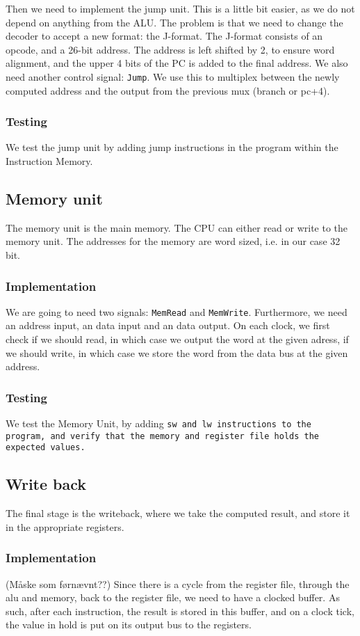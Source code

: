 Then we need to implement the jump unit. This is a little bit easier, as we do
not depend on anything from the ALU. The problem is that we need to change the
decoder to accept a new format: the J-format. The J-format consists of an
opcode, and a 26-bit address. The address is left shifted by 2, to ensure word
alignment, and the upper 4 bits of the PC is added to the final address. We
also need another control signal: \texttt{Jump}. We use this to multiplex
between the newly computed address and the output from the previous mux (branch
or pc+4).

\subsubsection*{Testing}
We test the jump unit by adding jump instructions in the program within the
Instruction Memory.

\subsection{Memory unit}
The memory unit is the main memory. The CPU can either read or write to the
memory unit. The addresses for the memory are word sized, i.e. in our case 32
bit.

\subsubsection*{Implementation}
We are going to need two signals: \texttt{MemRead} and \texttt{MemWrite}.
Furthermore, we need an address input, an data input and an data output. On
each clock, we first check if we should read, in which case we output the word
at the given adress, if we should write, in which case we store the word from
the data bus at the given address.

\subsubsection*{Testing}
We test the Memory Unit, by adding \tt{sw} and \tt{lw} instructions to the
program, and verify that the memory and register file holds the expected
values.

\subsection{Write back}
The final stage is the writeback, where we take the computed result, and store
it in the appropriate registers.

\subsubsection*{Implementation}
(Måske som førnævnt??) Since there is a cycle from the register file, through
the alu and memory, back to the register file, we need to have a clocked
buffer. As such, after each instruction, the result is stored in this buffer,
and on a clock tick, the value in hold is put on its output bus to the
registers.

